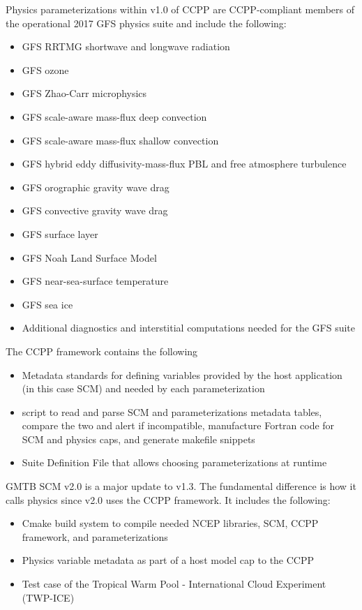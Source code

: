 Physics parameterizations within v1.0 of CCPP are CCPP-compliant members of the operational 2017 GFS physics suite and include the following:
\begin{itemize}
	\item GFS RRTMG shortwave and longwave radiation
	\item GFS ozone
	\item GFS Zhao-Carr microphysics
	\item GFS scale-aware mass-flux deep convection
	\item GFS scale-aware mass-flux shallow convection
	\item GFS hybrid eddy diffusivity-mass-flux PBL and free atmosphere turbulence
	\item GFS orographic gravity wave drag
	\item GFS convective gravity wave drag
	\item GFS surface layer
	\item GFS Noah Land Surface Model
	\item GFS near-sea-surface temperature
	\item GFS sea ice
	\item Additional diagnostics and interstitial computations needed for the GFS suite
\end{itemize}

The CCPP framework contains the following
\begin{itemize}
\item Metadata standards for defining variables provided by the host application (in this case SCM) and needed by each parameterization
\item {} script to read and parse SCM and parameterizations metadata tables, compare the two and alert if incompatible, manufacture Fortran code for SCM and physics caps, and generate makefile snippets
\item Suite Definition File that allows choosing parameterizations at runtime
\end{itemize}

GMTB SCM v2.0 is a major update to v1.3. The fundamental difference is how it calls physics since v2.0 uses the CCPP framework. It includes the following:

\begin{itemize}
\item Cmake build system to compile needed NCEP libraries, SCM, CCPP framework, and parameterizations
\item Physics variable metadata as part of a host model cap to the CCPP
\item Test case of the Tropical Warm Pool - International Cloud Experiment (TWP-ICE)
\end{itemize}

